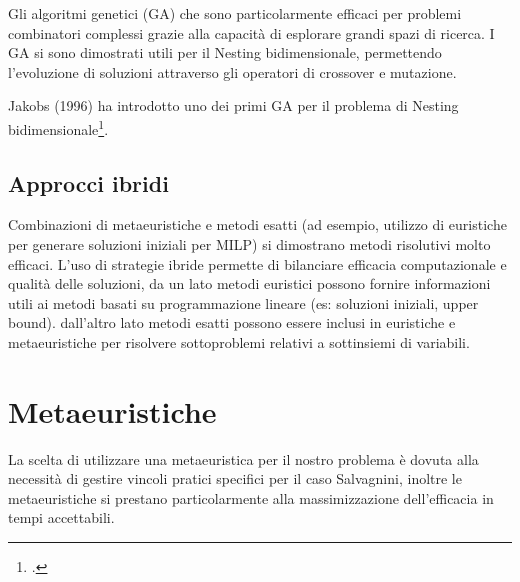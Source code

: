 Gli algoritmi genetici (GA) che sono particolarmente efficaci per problemi combinatori complessi grazie alla capacità di esplorare grandi spazi di ricerca. I GA si sono dimostrati utili per il Nesting bidimensionale, permettendo l'evoluzione di soluzioni attraverso gli operatori di crossover e mutazione.

Jakobs (1996) ha introdotto uno dei primi GA per il problema di Nesting bidimensionale\footcite{jakobs:nesting}.

\subsection{Approcci ibridi}

Combinazioni di metaeuristiche e metodi esatti (ad esempio, utilizzo di euristiche per generare soluzioni iniziali per MILP) si dimostrano metodi risolutivi molto efficaci. L'uso di strategie ibride permette di bilanciare efficacia computazionale e qualità delle soluzioni, da un lato metodi euristici possono fornire informazioni utili ai metodi basati su programmazione lineare (es: soluzioni iniziali, upper bound). dall'altro lato metodi esatti possono essere inclusi in euristiche e metaeuristiche per risolvere sottoproblemi relativi a sottinsiemi di variabili. 

\section{Metaeuristiche}

La scelta di utilizzare una metaeuristica per il nostro problema è dovuta alla necessità di gestire vincoli pratici specifici per il caso Salvagnini, inoltre le metaeuristiche si prestano particolarmente alla massimizzazione dell'efficacia in tempi accettabili.

